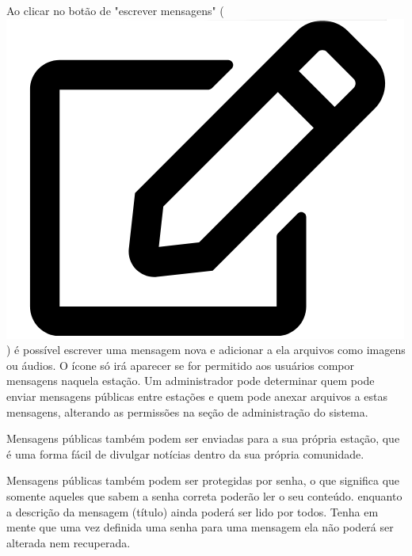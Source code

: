 \documentclass[11pt,a4paper]{article}
\begin{document}
Ao clicar no botão de "escrever mensagens" (\includegraphics[height=0.8\baselineskip]{pictures/edit.png}) 
é possível escrever uma mensagem nova e adicionar a ela arquivos como imagens ou áudios. O ícone só irá aparecer se for permitido aos usuários compor mensagens naquela estação. Um administrador pode determinar quem pode enviar mensagens públicas entre estações e quem pode anexar arquivos a estas mensagens, alterando as permissões na seção de administração do sistema.



Mensagens públicas também podem ser enviadas para a sua própria estação, que é uma forma fácil de divulgar notícias dentro da sua própria comunidade. 

Mensagens públicas também podem ser protegidas por senha, o que significa que somente aqueles que sabem a senha correta poderão ler o seu conteúdo. enquanto a descrição da mensagem (título) ainda poderá ser lido por todos. Tenha em mente que uma vez definida uma senha para uma mensagem ela não poderá ser alterada nem recuperada. 
\end{document}
